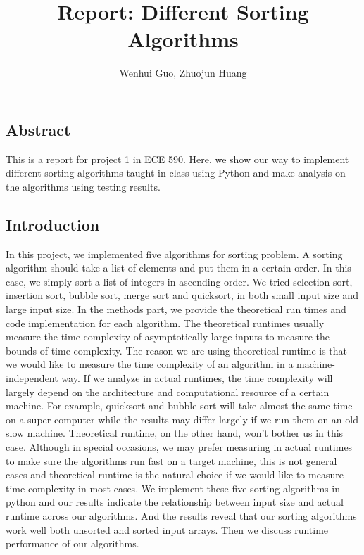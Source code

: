 \documentclass{article}
\begin{document}
\title{Report: Different Sorting Algorithms}
\author{Wenhui Guo, Zhuojun Huang}
\maketitle


\subsection*{Abstract}
This is a report for project 1 in ECE 590. Here, we show our way to implement different sorting algorithms taught in class using Python and make analysis on the algorithms using testing results.

\subsection*{Introduction}
In this project, we implemented five algorithms for sorting problem. A sorting algorithm should take a list of elements and put them in a certain order. In this case, we simply sort a list of integers in ascending order. We tried selection sort, insertion sort, bubble sort, merge sort and quicksort, in both small input size and large input size.
In the methods part, we provide the theoretical run times and code implementation for each algorithm. The theoretical runtimes usually measure the time complexity of asymptotically large inputs to measure the bounds of time complexity. The reason we are using theoretical runtime is that we would like to measure the time complexity of an algorithm in a machine-independent way. If we analyze in actual runtimes, the time complexity will largely depend on the architecture and computational resource of a certain machine. For example, quicksort and bubble sort will take almost the same time on a super computer while the results may differ largely if we run them on an old slow machine. Theoretical runtime, on the other hand, won’t bother us in this case. Although in special occasions, we may prefer measuring in actual runtimes to make sure the algorithms run fast on a target machine, this is not general cases and theoretical runtime is the natural choice if we would like to measure time complexity in most cases. 
We implement these five sorting algorithms in python and our results indicate the relationship between input size and actual runtime across our algorithms. And the results reveal that our sorting algorithms work well both unsorted and sorted input arrays. Then we discuss runtime performance of our algorithms.
\end{document}
